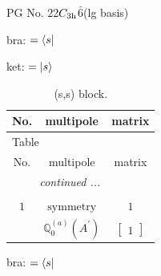 \documentclass[fleqn,8pt,landscape]{jsarticle}
\begin{document}
\setcounter{MaxMatrixCols}{32}

\renewcommand{\tablename}{Table~}
\renewcommand{\figurename}{Figure~}
\begin{center}
\LARGE
PG No. 22\quad$C_{\rm 3h}$\quad$\bar{6}$\quad[ hexagonal ] (lg basis)
\end{center}
bra: $=\bra{s}$

\noindent
ket: $=\ket{s}$
\renewcommand{\arraystretch}{1.6}
\begin{longtable}{ccc}
\caption{(s,s) block.}
 \\
 \hline \hline
No. & multipole & matrix \\ \hline \endfirsthead

\multicolumn{2}{l}{\tablename\ \thetable{}} \\
 \hline \hline
No. & multipole & matrix \\ \hline \endhead

 \hline \hline
\multicolumn{2}{r}{\footnotesize\it continued ...} \\ \endfoot

 \hline \hline
\multicolumn{2}{r}{} \\ \endlastfoot

$ 1 $ & $ \text{symmetry} $ & $ 1 $ \\
$  $ & $ \mathbb{Q}_{0}^{(a)}(A^{\prime}) $ & $ \begin{bmatrix} 1 \end{bmatrix} $ \\ \hline
\end{longtable}
bra: $=\bra{s}$
\end{document}
